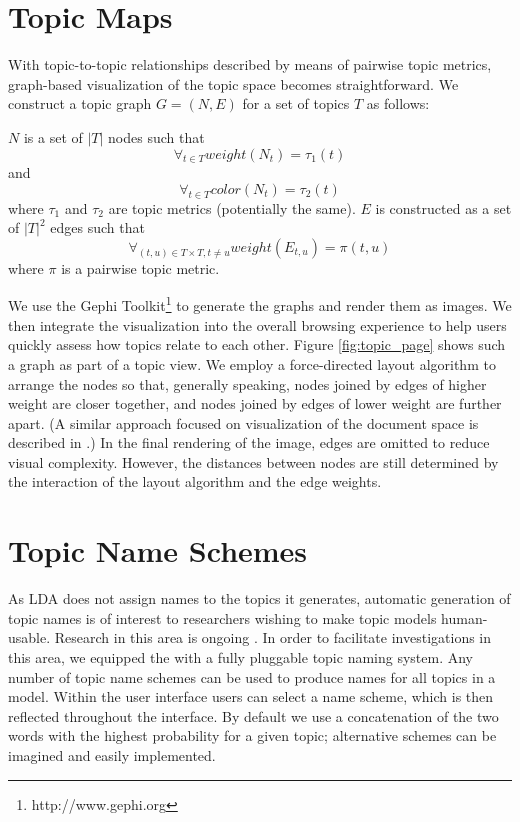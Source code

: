\documentclass[11pt]{article}
\begin{document}
\section{Topic Maps}\label{sec:maps}
With topic-to-topic relationships described by means of pairwise topic metrics,
graph-based visualization of the topic space becomes straightforward.  We
construct a topic graph $G = (N, E)$ for a set of topics $T$ as follows:

$N$ is a set of $|T|$ nodes such that
\[\forall_{t\in T} weight(N_{t}) = \tau_{1}(t)\]
and
\[\forall_{t\in T} color(N_{t}) = \tau_{2}(t)\]
where $\tau_1$ and $\tau_2$ are topic metrics (potentially the same).
$E$ is constructed as a set of $|T|^2$ edges such that
  \[\forall_{(t,u)\in T\times T, t\neq u} weight(E_{t,u}) = \pi(t,u)\]
where $\pi$ is a pairwise topic metric.

We use the Gephi Toolkit\footnote{http://www.gephi.org} to generate the graphs and
render them as images. We then integrate the visualization into the overall
browsing experience to help users quickly assess how topics relate to each
other. Figure \ref{fig:topic_page} shows such a graph as part of a topic view. 
We employ a force-directed layout algorithm to arrange
the nodes so that, generally speaking, nodes joined by edges of higher weight
are closer together, and nodes joined by edges of lower weight are further
apart. (A similar approach focused on visualization of the document space is
described in .) In the final rendering of the image, edges 
are omitted to reduce visual complexity. However, the distances between nodes %
are still determined by the interaction of the layout algorithm and the edge
weights.

\section{Topic Name Schemes}
As LDA does not assign names to the topics it generates, automatic generation of
topic names is of interest to researchers wishing to make topic models
human-usable. Research in this area is ongoing \cite{Mei2007,Lau2010}. In order to
facilitate investigations in this area, we equipped the \tool{} with a
fully pluggable topic naming system. Any number of topic name schemes can be
used to produce names for all topics in a model. Within the user interface
users can select a name scheme, which is then reflected throughout the
interface. By default we use a concatenation of the two
words with the highest probability for a given topic; alternative schemes
can be imagined and easily implemented.%
\end{document}
